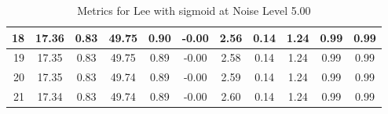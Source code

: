 \begin{table}[htb]
\begin{tabular}{|r|cccccccccc|}
      18 &  17.36 &  0.83 &  49.75 &  0.90 &  -0.00 &  2.56 &  0.14 &  1.24 &  0.99 &  0.99  \\ \hline 
      19 &  17.35 &  0.83 &  49.75 &  0.89 &  -0.00 &  2.58 &  0.14 &  1.24 &  0.99 &  0.99  \\ \hline 
      20 &  17.35 &  0.83 &  49.74 &  0.89 &  -0.00 &  2.59 &  0.14 &  1.24 &  0.99 &  0.99  \\ \hline 
      21 &  17.34 &  0.83 &  49.74 &  0.89 &  -0.00 &  2.60 &  0.14 &  1.24 &  0.99 &  0.99  \\ \hline 
    \end{tabular}
    \caption{Metrics for Lee with sigmoid at Noise Level 5.00}
    \end{table}


